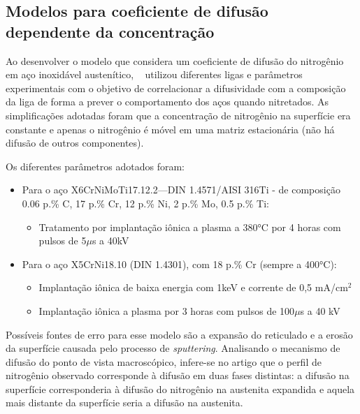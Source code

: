\documentclass[]{politex}
\begin{document}
\subsection{Modelos para coeficiente de difusão dependente da concentração}
\label{sec:concdep}
	Ao desenvolver o modelo que considera um coeficiente de difusão do nitrogênio em aço inoxidável austenítico, ~\cite{mandl2003nitrogen} utilizou diferentes ligas e parâmetros experimentais com o objetivo de correlacionar a difusividade com a composição da liga de forma a prever o comportamento dos aços quando nitretados. As simplificações adotadas foram que a concentração de nitrogênio na superfície era constante e apenas o nitrogênio é móvel em uma matriz estacionária (não há difusão de outros componentes).\par
	Os diferentes parâmetros adotados foram:
	\begin{itemize}
	 \item Para o aço X6CrNiMoTi17.12.2—DIN 1.4571/AISI 316Ti - de composição 0.06 p.\% C, 17 p.\% Cr, 12 p.\% Ni, 2 p.\% Mo, 0.5 p.\% Ti:
		\begin{itemize}
		 \item Tratamento por implantação iônica a plasma a 380°C por 4 horas com pulsos de 5$\mu$s a 40kV
		\end{itemize}
	 \item Para o aço X5CrNi18.10 (DIN 1.4301), com 18 p.\% Cr (sempre a 400°C):
		\begin{itemize}
		 \item Implantação iônica de baixa energia com 1keV e corrente de 0,5 mA/cm$^2$
		 \item Implantação iônica a plasma por 3 horas com pulsos de 100$\mu$s a 40 kV
		\end{itemize} 
	\end{itemize}
	Possíveis fontes de erro para esse modelo são a expansão do reticulado e a erosão da superfície causada pelo processo de \textit{sputtering}.
	Analisando o mecanismo de difusão do ponto de vista macroscópico, infere-se no artigo que o perfil de nitrogênio observado corresponde à difusão em duas fases distintas: a difusão na superfície corresponderia à difusão do nitrogênio na austenita expandida e aquela mais distante da superfície seria a difusão na austenita.\par
\end{document}
